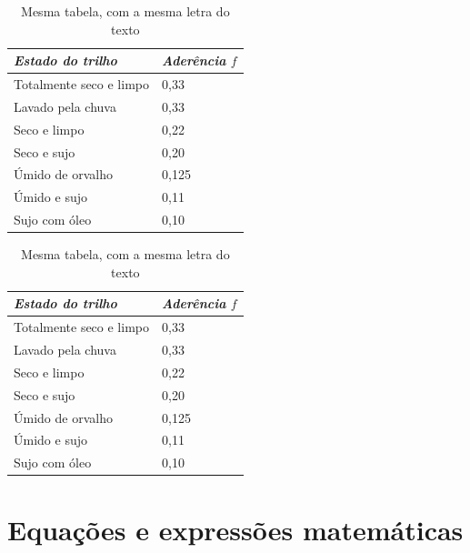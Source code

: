 \begin{table}
\begin{minipage}[t]{72mm}\centering\sffamily
  {\caption[Valores da aderência $f$ para diversos estados do trilho] 
  		{Valores da aderência $f$ para diversos estados do trilho \cite{hay82}\label{tab-aderencia}}}
    {\footnotesize %
\begin{tabular}{ll} \toprule
  \textbf{\textit{Estado do trilho}} & \textbf{\textit{Aderência}} $f$ \\ \midrule
  Totalmente seco e limpo & 0,33 \\
  Lavado pela chuva       & 0,33 \\
  Seco e limpo            & 0,22 \\
  Seco e sujo             & 0,20 \\
  Úmido de orvalho        & 0,125 \\
  Úmido e sujo            & 0,11 \\
  Sujo com óleo           & 0,10 \\ \bottomrule
\end{tabular}}
\end{minipage}
\hfill
\begin{minipage}[t]{75mm}\centering\rmfamily
  \caption{Mesma tabela, com a mesma letra do texto \label{tab-aderencia-rm}}
    {\footnotesize %
\begin{tabular}{ll} \toprule
  \textbf{\textit{Estado do trilho}} & \textbf{\textit{Aderência}} $f$ \\ \midrule
  Totalmente seco e limpo & 0,33 \\
  Lavado pela chuva       & 0,33 \\
  Seco e limpo            & 0,22 \\
  Seco e sujo             & 0,20 \\
  Úmido de orvalho        & 0,125 \\
  Úmido e sujo            & 0,11 \\
  Sujo com óleo           & 0,10 \\ \bottomrule
\end{tabular}}
\end{minipage}
\end{table}


\section{Equações e expressões matemáticas}

